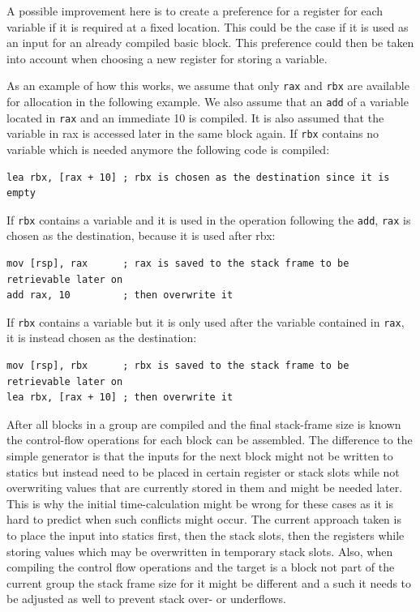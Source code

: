 \documentclass[course=eragp]{aspdoc}
\begin{document}
\par

A possible improvement here is to create a preference for a register for each variable if it is
required at a fixed location. This could be the case if it is used as an input for an already compiled basic block.
This preference could then be taken into account when choosing a new register for storing a variable.

\par

As an example of how this works, we assume that only \texttt{rax} and \texttt{rbx} are available for allocation in the
following example. We also assume that an \texttt{add} of a variable located in \texttt{rax} and an
immediate 10 is compiled.
It is also assumed that the variable in rax is accessed later in the same block again.
If \texttt{rbx} contains no variable which is needed anymore the following code is compiled:
\begin{lstlisting}[language={[x86masm]Assembler},float=h]
lea rbx, [rax + 10] ; rbx is chosen as the destination since it is empty
\end{lstlisting}
\FloatBarrier

If \texttt{rbx} contains a variable and it is used in the operation following the \texttt{add},
\texttt{rax} is chosen as the destination, because it is used after rbx:
\begin{lstlisting}[language={[x86masm]Assembler},float=h]
mov [rsp], rax      ; rax is saved to the stack frame to be retrievable later on
add rax, 10         ; then overwrite it
\end{lstlisting}
\FloatBarrier

If \texttt{rbx} contains a variable but it is only used after the variable contained in
\texttt{rax}, it is instead chosen as the destination:
\begin{lstlisting}[language={[x86masm]Assembler},float=h]
mov [rsp], rbx      ; rbx is saved to the stack frame to be retrievable later on
lea rbx, [rax + 10] ; then overwrite it
\end{lstlisting}

\FloatBarrier
\par

After all blocks in a group are compiled and the final stack-frame size is known the control-flow operations for each block can be assembled.
The difference to the simple generator is that the inputs for the next block might not
be written to statics but instead need to be placed in certain register or stack slots
while not overwriting values that are currently stored in them and might be needed later.
This is why the initial time-calculation might be wrong for these cases as it is hard to predict when such
conflicts might occur. The current approach taken is to place the input into statics first, then the stack slots, then the registers while storing values which may be overwritten in temporary stack slots.
Also, when compiling the control flow operations and the target is a block not part of the current group the stack frame size for it might be different and a such it needs to be adjusted as well to prevent stack over- or underflows.
\end{document}
